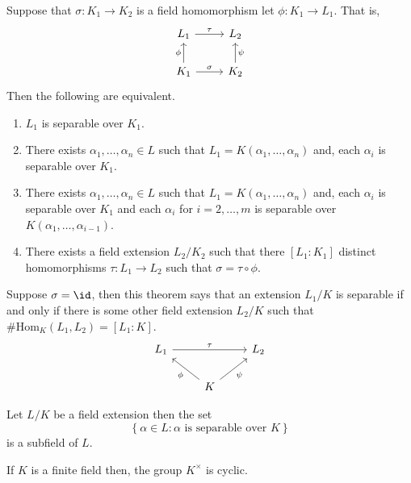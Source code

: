 \documentclass[12pt, a4paper]{article}
\begin{document}
\begin{mdthm}
    Suppose that \(\sigma:K_1 \to K_2\) is a field homomorphism let \(\phi :K_1\to L_1\). That is,
    \[\begin{tikzcd}
        {L_1} & {L_2} \\
        {K_1} & {K_2}
        \arrow["\tau", from=1-1, to=1-2]
        \arrow["{\phi}", from=2-1, to=1-1]
        \arrow["\sigma", from=2-1, to=2-2]
        \arrow["{\psi}"', from=2-2, to=1-2]
    \end{tikzcd}\]
    Then the following are equivalent.
    \begin{enumerate}
        \item \(L_1\) is separable over \(K_1\).
        \item There exists \(\alpha_1,\ldots,\alpha_n\in L\) such that \(L_1 = K(\alpha_1,\ldots,\alpha_n)\) and, each \(\alpha_i\) is separable over \(K_1\).
        \item There exists \(\alpha_1,\ldots,\alpha_n\in L\) such that \(L_1 = K(\alpha_1,\ldots,\alpha_n)\) and, each \(\alpha_i\) is separable over \(K_1\) and each \(\alpha_i\) for \(i=2,\ldots,m\) is separable over \(K(\alpha_1,\ldots,\alpha_{i-1})\).
        \item There exists a field extension \(L_2/K_2\) such that there \([L_1:K_1]\) distinct homomorphisms \(\tau:L_1\to L_2\) such that \(\sigma=\tau \circ \phi\).
    \end{enumerate}
\end{mdthm}

\begin{mdnote}
    Suppose \(\sigma=\id\), then this theorem says that an extension \(L_1/K\) is separable if and only if there is some other field extension \(L_2/K\) such that \ul{\(\#\text{Hom}_K(L_1,L_2) = [L_1:K]\)}.
    \[\begin{tikzcd}
        {L_1} && {L_2} \\
        & K
        \arrow["\tau", from=1-1, to=1-3]
        \arrow["{\phi}", from=2-2, to=1-1]
        \arrow["{\psi}"', from=2-2, to=1-3]
    \end{tikzcd}\]
\end{mdnote}

\begin{corollary}
    Let \(L/K\) be a field extension then the set
    \[\left\{ \alpha \in L : \alpha \text{ is separable over } K \right\}\]
    is a subfield of \(L\).
\end{corollary}

\begin{lemma}
    If \(K\) is a finite field then, the group \(K^{\times}\) is cyclic.
\end{lemma}
\end{document}
